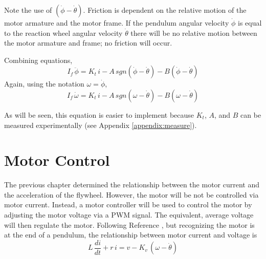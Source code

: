\documentclass[12pt,letterpaper]{article}
\begin{document}

Note the use of $(\dot{\phi} - \dot{\theta})$.  Friction is dependent on the relative motion of the motor armature and the motor frame.  If the pendulum angular velocity $\dot{\phi}$ is equal to the reaction wheel angular velocity $\dot{\theta}$ there will be no relative motion between the motor armature and frame; no friction will occur.

Combining equations,
%
\begin{equation}
    I_{f} \, \ddot{\phi}  = K_{t} \, i - A \, sgn(\dot{\phi} - \dot{\theta} ) - B (\dot{\phi} - \dot{\theta})
\end{equation}
%
Again, using the notation $\omega = \dot{\phi}$,
%
\begin{equation}
    I_{f} \, \dot{\omega}  = K_{t} \, i - A \, sgn(\omega - \dot{\theta}) - B (\omega - \dot{\theta}) \label{wheel}
\end{equation}
%

As will be seen, this equation is easier to implement because $K_{t}$, $A$, and $B$ can be measured experimentally (see Appendix \ref{appendix:measure}).  







\section{Motor Control}
The previous chapter determined the relationship between the motor current and the acceleration of the flywheel.  
However, the motor will be not be controlled via motor current.  Instead, a motor controller will be used to control the 
motor by adjusting the motor voltage via a PWM signal.  The equivalent, average voltage will then regulate the motor.  
Following Reference \cite{monograph}, but recognizing the motor is at the end of a pendulum, the relationship between motor current and voltage is
%
\begin{equation}
    L\, \frac{di}{dt} + r \,i = v - K_{v} \, (\omega - \dot{\theta})
\end{equation}
%

\end{document}
